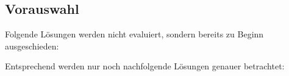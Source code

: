 
\begin{flushleft}
    \subsection{Vorauswahl}
    Folgende Lösungen werden nicht evaluiert, sondern bereits zu Beginn ausgeschieden:
    

    Entsprechend werden nur noch nachfolgende Lösungen genauer betrachtet:
    
\end{flushleft}